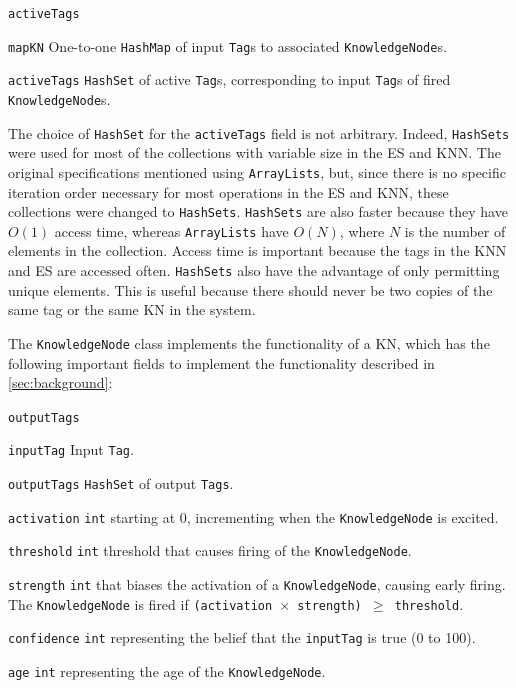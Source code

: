 \documentclass[titlepage,11pt]{article}
\newcommand{\code}[1]{\texttt{#1}}
\begin{document}
\begin{labeling}{\code{activeTags}}
	\item[\code{mapKN}] One-to-one \code{HashMap} of input \code{Tag}s to associated \code{KnowledgeNode}s.
	\item[\code{activeTags}] \code{HashSet} of active \code{Tag}s, corresponding to input \code{Tag}s of fired \code{KnowledgeNode}s.
\end{labeling}

The choice of \code{HashSet} for the \code{activeTags} field is not arbitrary. Indeed, \code{HashSets} were used for most of the collections with variable size in the ES and KNN. The original specifications mentioned using \code{ArrayLists}, but, since there is no specific iteration order necessary for most operations in the ES and KNN, these collections were changed to \code{HashSets}. \code{HashSets} are also faster because they have $O(1)$ access time, whereas \code{ArrayLists} have $O(N)$, where $N$ is the number of elements in the collection. Access time is important because the tags in the KNN and ES are accessed often. \code{HashSets} also have the advantage of only permitting unique elements. This is useful because there should never be two copies of the same tag or the same KN in the system.

The \code{KnowledgeNode} class implements the functionality of a KN, which has the following important fields to implement the functionality described in \autoref{sec:background}:

\begin{labeling}{\code{outputTags}}
	\item[\code{inputTag}] Input \code{Tag}.
	\item[\code{outputTags}] \code{HashSet} of output \code{Tags}.
	\item[\code{activation}] \code{int} starting at 0, incrementing when the \code{KnowledgeNode} is excited.
	\item[\code{threshold}] \code{int} threshold that causes firing of the \code{KnowledgeNode}.
	\item[\code{strength}] \code{int} that biases the activation of a \code{KnowledgeNode}, causing early firing. The \code{KnowledgeNode} is fired if \code{(activation $\times$ strength) $\geq$ threshold}.
	\item[\code{confidence}] \code{int} representing the belief that the \code{inputTag} is true (0 to 100).
	\item[\code{age}] \code{int} representing the age of the \code{KnowledgeNode}.
\end{labeling}
\end{document}
